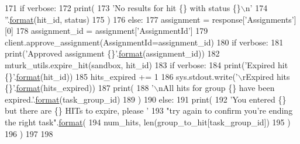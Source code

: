 \begin{DoxyCode}
171                             \textcolor{keywordflow}{if} verbose:
172                                 print(
173                                     \textcolor{stringliteral}{'No results for hit \{\} with status \{\}\(\backslash\)n'}
174                                     \textcolor{stringliteral}{''}.\hyperlink{namespaceparlai_1_1chat__service_1_1services_1_1messenger_1_1shared__utils_a32e2e2022b824fbaf80c747160b52a76}{format}(hit\_id, status)
175                                 )
176                         \textcolor{keywordflow}{else}:
177                             assignment = response[\textcolor{stringliteral}{'Assignments'}][0]
178                             assignment\_id = assignment[\textcolor{stringliteral}{'AssignmentId'}]
179                             client.approve\_assignment(AssignmentId=assignment\_id)
180                             \textcolor{keywordflow}{if} verbose:
181                                 print(\textcolor{stringliteral}{'Approved assignment \{\}'}.\hyperlink{namespaceparlai_1_1chat__service_1_1services_1_1messenger_1_1shared__utils_a32e2e2022b824fbaf80c747160b52a76}{format}(assignment\_id))
182                     mturk\_utils.expire\_hit(sandbox, hit\_id)
183                     \textcolor{keywordflow}{if} verbose:
184                         print(\textcolor{stringliteral}{'Expired hit \{\}'}.\hyperlink{namespaceparlai_1_1chat__service_1_1services_1_1messenger_1_1shared__utils_a32e2e2022b824fbaf80c747160b52a76}{format}(hit\_id))
185                     hits\_expired += 1
186                     sys.stdout.write(\textcolor{stringliteral}{'\(\backslash\)rExpired hits \{\}'}.\hyperlink{namespaceparlai_1_1chat__service_1_1services_1_1messenger_1_1shared__utils_a32e2e2022b824fbaf80c747160b52a76}{format}(hits\_expired))
187                 print(
188                     \textcolor{stringliteral}{'\(\backslash\)nAll hits for group \{\} have been expired.'}.\hyperlink{namespaceparlai_1_1chat__service_1_1services_1_1messenger_1_1shared__utils_a32e2e2022b824fbaf80c747160b52a76}{format}(task\_group\_id)
189                 )
190             \textcolor{keywordflow}{else}:
191                 print(
192                     \textcolor{stringliteral}{'You entered \{\} but there are \{\} HITs to expire, please '}
193                     \textcolor{stringliteral}{"try again to confirm you're ending the right task"}.\hyperlink{namespaceparlai_1_1chat__service_1_1services_1_1messenger_1_1shared__utils_a32e2e2022b824fbaf80c747160b52a76}{format}(
194                         num\_hits, len(group\_to\_hit[task\_group\_id])
195                     )
196                 )
197 
198 
\end{DoxyCode}
